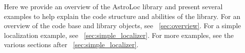Here we provide an overview of the AstroLoc library and present several examples to help explain the code structure and abilities of the library.
For an overview of the code base and library objects, see ~\ref{sec:overview}.
For a simple localization example, see ~\ref{sec:simple_localizer}.
For more examples, see the various sections after ~\ref{sec:simple_localizer}.




